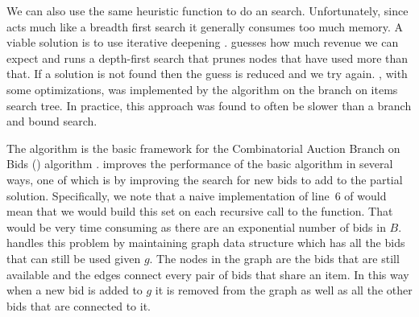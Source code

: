 We can also use the same heuristic function to do an \astar{} search.
Unfortunately, since \astar{} acts much like a breadth first search it
generally consumes too much memory. A viable solution is to use
iterative deepening \astar{}. \idastar{} guesses how much revenue we
can expect and runs a depth-first search that prunes nodes that have
used more than that. If a solution is not found then the guess is
reduced and we try again. \idastar{}, with some optimizations, was
implemented by the  algorithm \cite{sandholm99a} on the
branch on items search tree. In practice, this approach was found to
often be slower than a branch and bound search.


The  algorithm is the basic framework for the
Combinatorial Auction Branch on Bids () algorithm
\cite{sandholm05a}.   improves the performance of the
basic algorithm in several ways, one of which is by improving the
search for new bids to add to the partial solution. Specifically, we
note that a naive implementation of line~6 of
 would mean that we would build this
set on each recursive call to the function.  That would be very time
consuming as there are an exponential number of bids in $B$.
 handles this problem by maintaining graph data structure
which has all the bids that can still be used given $g$. The nodes in
the graph are the bids that are still available and the edges connect
every pair of bids that share an item.  In this way when a new bid is
added to $g$ it is removed from the graph as well as all the other
bids that are connected to it.


